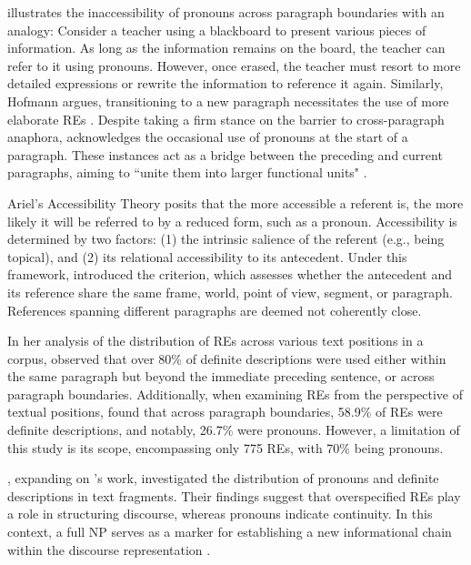 \citeauthor{Hofmann1989} illustrates the inaccessibility of pronouns across paragraph boundaries with an analogy: Consider a teacher using a blackboard to present various pieces of information. As long as the information remains on the board, the teacher can refer to it using pronouns. However, once erased, the teacher must resort to more detailed expressions or rewrite the information to reference it again. Similarly, Hofmann argues, transitioning to a new paragraph necessitates the use of more elaborate REs \citep{Hofmann1989}. Despite taking a firm stance on the barrier to cross-paragraph anaphora, \citeauthor{Hofmann1989} acknowledges the occasional use of pronouns at the start of a paragraph. These instances act as a bridge between the preceding and current paragraphs, aiming to ``unite them into larger functional units" \citep[245]{Hofmann1989}.

Ariel's Accessibility Theory \citeyearpar{ariel1990accessing,ariel2004accessibility} posits that the more accessible a referent is, the more likely it will be referred to by a reduced form, such as a pronoun. Accessibility is determined by two factors: (1) the intrinsic salience of the referent (e.g., being topical), and (2) its relational accessibility to its antecedent. Under this framework, \citeauthor{ariel1990accessing} introduced the  criterion, which assesses whether the antecedent and its reference share the same frame, world, point of view, segment, or paragraph. References spanning different paragraphs are deemed not coherently close.

In her analysis of the distribution of REs across various text positions in a corpus, \citet{ariel1990accessing} observed that over 80\% of definite descriptions were used either within the same paragraph but beyond the immediate preceding sentence, or across paragraph boundaries. Additionally, when examining REs from the perspective of textual positions, \citeauthor{ariel1990accessing} found that across paragraph boundaries, 58.9\% of REs were definite descriptions, and notably, 26.7\% were pronouns. However, a limitation of this study is its scope, encompassing only 775 REs, with 70\% being pronouns.

\citet{vonk1992use}, expanding on \citeauthor{ariel1990accessing}'s work, investigated the distribution of pronouns and definite descriptions in text fragments. Their findings suggest that overspecified REs play a role in structuring discourse, whereas pronouns indicate continuity. In this context, a full NP serves as a marker for establishing a new informational chain within the discourse representation \citep{vonk1992use,Smith2003}.

